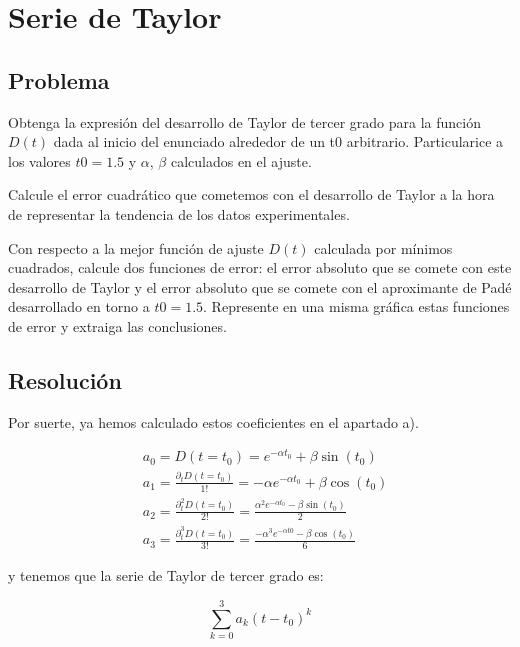 \section{Serie de Taylor}

\subsection{Problema}
Obtenga la expresión del desarrollo de Taylor de tercer grado para la función $D(t)$
dada al inicio del enunciado alrededor de un t0 arbitrario. Particularice a los valores 
$t0 = 1.5$ y $\alpha$, $\beta$ calculados en el ajuste.

Calcule el error cuadrático que cometemos con el desarrollo de Taylor a la hora
de representar la tendencia de los datos experimentales.

Con respecto a la mejor función de ajuste $D(t)$ calculada por mínimos cuadrados,
calcule dos funciones de error: el error absoluto que se comete con este desarrollo de
Taylor y el error absoluto que se comete con el aproximante de Padé desarrollado
en torno a $t0 = 1.5$. Represente en una misma gráfica estas funciones de error y
extraiga las conclusiones.

\subsection{Resolución}

Por suerte, ya hemos calculado estos coeficientes en el apartado a).

\begin{align*}
	&a_0 = D(t=t_0)  = e^{-\alpha t_0} + \beta \sin(t_0) \\
&a_1 = \frac{\partial_t D(t=t_0)}{1!} 
= -\alpha e^{-\alpha t_0} + \beta \cos(t_0) \\
&a_2 = \frac{\partial_t^2 D(t=t_0)}{2!}
= \frac{\alpha^2 e^{-\alpha t_0} - \beta \sin(t_0)}{2}
\\
&a_3 = \frac{\partial_t^3 D(t=t_0)}{3!}
= \frac{-\alpha^3 e^{-\alpha t0} - \beta \cos(t_0)}{6}	
\end{align*}

y tenemos que la serie de Taylor de tercer grado es: 

$$
\sum_{k=0}^{3} a_k (t - t_0)^k
$$